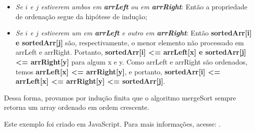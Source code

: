 \begin{itemize}
    \item \emph{Se $i$ e $j$ estiverem ambos em \textbf{arrLeft} ou em \textbf{arrRight}}: Então a propriedade de ordenação segue da hipótese de indução;
    
    \item \emph{Se $i$ e $j$ estiverem um em \textbf{arrLeft} e outro em \textbf{arrRight}}: Então \textbf{sortedArr[i] e sortedArr[j]} são, respectivamente, o menor elemento não processado em arrLeft e arrRight. Portanto, \textbf{sortedArr[i] <= arrLeft[x] e sortedArr[j] <= arrRight[y]} para algum x e y. Como arrLeft e arrRight são ordenados, temos \textbf{arrLeft[x] <= arrRight[y]}, e portanto, \textbf{sortedArr[i] <= arrLeft[x] <= arrRight[y] <= sortedArr[j]}.
\end{itemize}

Dessa forma, provamos por indução finita que o algoritmo mergeSort sempre retorna um array ordenado em ordem crescente.

Este exemplo foi criado em JavaScript. Para mais informações, acesse: . \\




